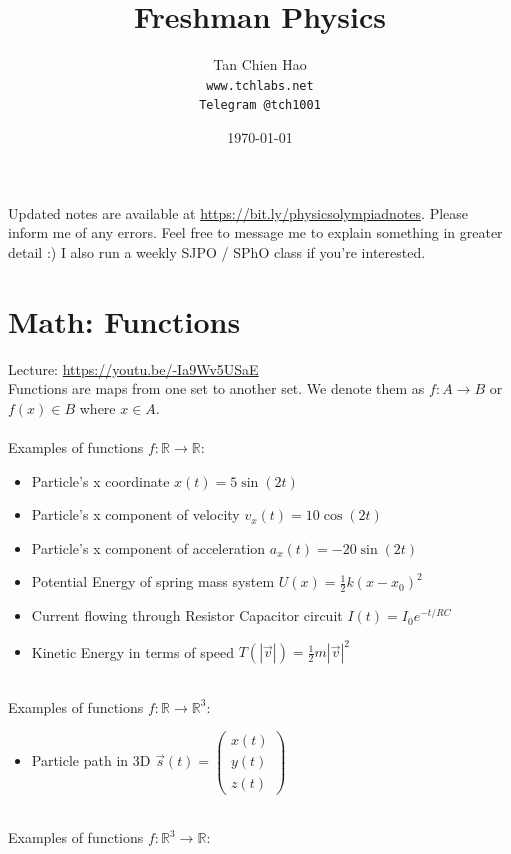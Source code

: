 \documentclass{article}
\title{Freshman Physics}
\author{
    Tan Chien Hao\\
    \texttt{www.tchlabs.net}\\
    \texttt{Telegram @tch1001}
}
\date{\today}
\begin{document}
\newif\ifpaper

\papertrue

\maketitle

Updated notes are available at \url{https://bit.ly/physicsolympiadnotes}. Please inform me of any errors. Feel free to message me to explain something in greater detail :) I also run a weekly SJPO / SPhO class if you're interested.
\tableofcontents

\section{Math: Functions}
Lecture: \url{https://youtu.be/-Ia9Wv5USaE}\\[10pt]
Functions are maps from one set to another set. We denote them as $f: A \rightarrow B$ or $f(x) \in B$ where $x\in A$. \\
\\
Examples of functions $f: \mathbb R \to \mathbb R$:
\begin{itemize}
    \item Particle's x coordinate $x(t) = 5 \sin (2t)$
    \item Particle's x component of velocity $v_x(t) = 10 \cos (2t)$
    \item Particle's x component of acceleration $a_x(t) = - 20 \sin (2t)$
    \item Potential Energy of spring mass system $U(x) = \frac{1}{2} k(x-x_0)^2$
    \item Current flowing through Resistor Capacitor circuit $I(t) = I_0 e^{-{t}/{RC}}$
    \item Kinetic Energy in terms of speed $T(|\vec{v}|) = \frac{1}{2} m |\vec{v}|^2$
\end{itemize}
\leavevmode \\
Examples of functions $f: \mathbb R \to \mathbb R^3$:
\begin{itemize}
    \item Particle path in 3D $\vec{s}(t) = \left(\begin{array}{l}
         x(t) \\
         y(t) \\
         z(t) 
    \end{array}\right) $
\end{itemize}
\leavevmode \\
Examples of functions $f: \mathbb R^3 \to \mathbb R$:
\end{document}
